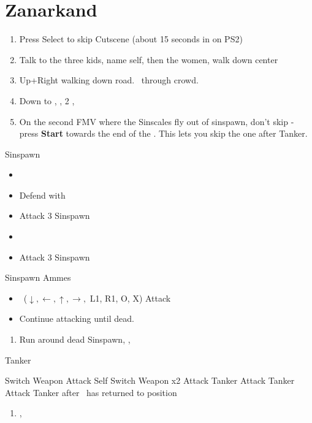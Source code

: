 \chapter{Zanarkand}

\begin{enumerate}
	\item Press Select to skip Cutscene (about 15 seconds in on PS2)
	\item Talk to the three kids, name self, then the women, walk down center
	\item Up+Right walking down road. \sd\ through crowd. \skippablefmv[2:30]
	\item Down to \auron, \sd, 2 \skippablefmv[2:30], \sd
	\item On the second FMV where the Sinscales fly out of sinspawn, don't skip - press \textbf{Start} towards the end of the \fmv. This lets you skip the one after Tanker.
\end{enumerate}
\begin{battle}{Sinspawn}
	\begin{itemize}
		\item \sd
		\item Defend with \tidus
		\item Attack 3 Sinspawn
		\item \sd
		\item Attack 3 Sinspawn
	\end{itemize}
\end{battle}
\begin{battle}[2400]{Sinspawn Ammes}
	\begin{itemize}
		\item \sd
		\auronf \od\ ($\downarrow, \leftarrow, \uparrow, \rightarrow,$ L1, R1, O, X)
		\tidusf Attack
		\tidusf \od
		\item Continue attacking until dead.
	\end{itemize}
\end{battle}
\begin{enumerate}[resume]
	\item Run around dead Sinspawn, \save, \sd
\end{enumerate}
\begin{battle}[1000]{Tanker}
	\begin{itemize}
		\tidusf Switch Weapon
		\auronf Attack Self
		\tidusf Switch Weapon x2
		\tidusf Attack Tanker
		\auronf Attack Tanker
		\tidusf Attack Tanker after \auron\ has returned to position
	\end{itemize}
\end{battle}
\begin{enumerate}[resume]
	\item \cs[2:00], \skippablefmv
\end{enumerate}